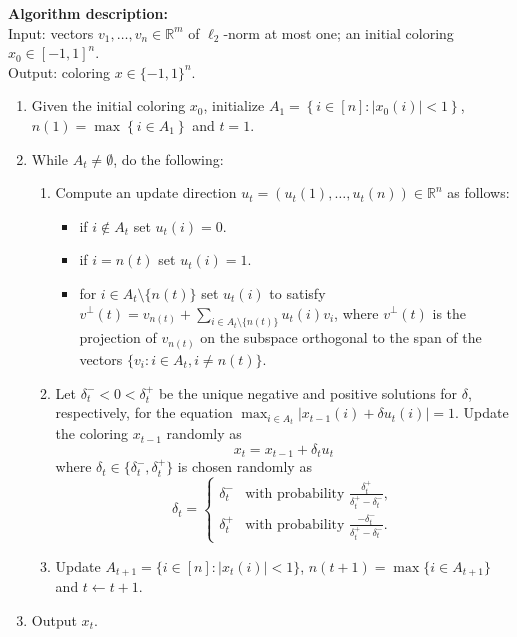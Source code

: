 \documentclass[11pt]{article}
\numberwithin{equation}{section}
\theoremstyle{definition}
\theoremstyle{plain}
\newcommand{\R}{\mathbb R}
\newcommand{\set}[1]{\left\{ #1 \right\}}
\begin{document}
\begin{tcolorbox}
\textbf{Algorithm description:}\\
Input: vectors $v_1,\ldots,v_n \in \R^m$ of $\ell_2$-norm at most one; an initial coloring $x_0 \in [-1,1]^n$.\\
Output: coloring $x \in \{-1,1\}^n$.
\begin{enumerate}
\item Given the initial coloring $x_0$, initialize $A_1 = \set{i \in [n]: |x_0(i)| < 1}$, $n(1) = \max \set{i \in A_1}$ and $t=1$.
\item While $A_t \neq \emptyset$, do the following:
\begin{enumerate}
\item Compute an update direction $u_t=(u_t(1),\ldots,u_t(n)) \in \mathbb{R}^n$ as follows:
\begin{itemize}
\item if $i \notin A_t$ set $u_t(i)=0$.
\item if $i=n(t)$ set $u_t(i)=1$.
\item for $i \in A_t \setminus \{n(t)\}$ set $u_t(i)$ to satisfy $v^\perp(t)=v_{n(t)}+\sum_{i \in A_t \setminus \{n(t)\}}  u_t(i) v_i$,
 where $v^{\perp}(t)$ is the projection of $v_{n(t)}$ on the subspace orthogonal to the span
of the vectors $\{v_i: i\in A_t, i\neq n(t)\}$.
\end{itemize}
\item Let $\delta^{-}_t <0< \delta^{+}_t$ be the unique negative and positive
solutions for $\delta$, respectively, for the equation
$\max_{i \in A_t} |x_{t-1}(i) + \delta u_t(i)| = 1$.
Update the coloring $x_{t-1}$ randomly as
\[ x_t = x_{t-1} + \delta_t u_t \]
where $\delta_t \in \{\delta^{-}_t,\delta^{+}_t\}$ is chosen randomly as
\[
\delta_t =
\begin{cases}
\delta^{-}_t & \text{with probability } \frac{ \delta^{+}_t}{ \delta^{+}_t -  \delta^{-}_t},\\
\delta^{+}_t & \text{with probability } \frac{ -\delta^{-}_t}{ \delta^{+}_t -  \delta^{-}_t}.
\end{cases}
\]
\item Update $A_{t+1} = \{i \in [n]: |x_t(i)| < 1\}$, $n(t+1) = \max \{i \in
A_{t+1}\}$ and $t \leftarrow t+1$.
\end{enumerate}
\item Output $x_t$.
\end{enumerate}
\end{tcolorbox}
\end{document}
